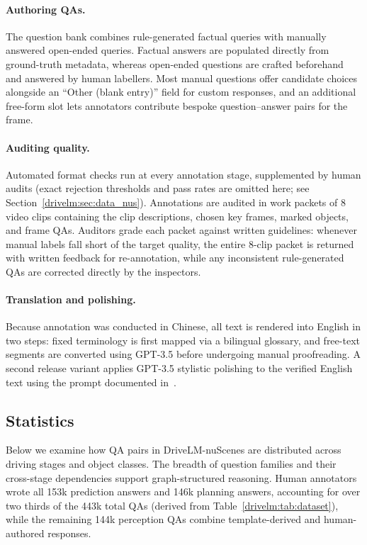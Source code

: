 \paragraph{Authoring QAs.}
The question bank combines rule-generated factual queries with manually answered open-ended queries. Factual answers are populated directly from ground-truth metadata, whereas open-ended questions are crafted beforehand and answered by human labellers. Most manual questions offer candidate choices alongside an ``Other (blank entry)'' field for custom responses, and an additional free-form slot lets annotators contribute bespoke question--answer pairs for the frame.

\paragraph{Auditing quality.}
Automated format checks run at every annotation stage, supplemented by human audits (exact rejection thresholds and pass rates are omitted here; see Section~\ref{drivelm:sec:data_nus}). Annotations are audited in work packets of 8 video clips containing the clip descriptions, chosen key frames, marked objects, and frame QAs. Auditors grade each packet against written guidelines: whenever manual labels fall short of the target quality, the entire 8-clip packet is returned with written feedback for re-annotation, while any inconsistent rule-generated QAs are corrected directly by the inspectors.

\paragraph{Translation and polishing.}
Because annotation was conducted in Chinese, all text is rendered into English in two steps: fixed terminology is first mapped via a bilingual glossary, and free-text segments are converted using GPT-3.5 before undergoing manual proofreading. A second release variant applies GPT-3.5 stylistic polishing to the verified English text using the prompt documented in~\cite{sima2024drivelm}.

\subsection{Statistics}\label{drivelm:app:nus_stats}

Below we examine how QA pairs in DriveLM-nuScenes are distributed across driving stages and object classes. The breadth of question families and their cross-stage dependencies support graph-structured reasoning. Human annotators wrote all 153k prediction answers and 146k planning answers, accounting for over two thirds of the 443k total QAs (derived from Table~\ref{drivelm:tab:dataset}), while the remaining 144k perception QAs combine template-derived and human-authored responses.

